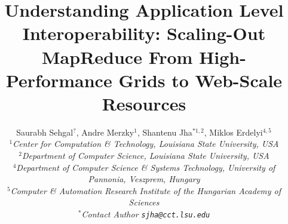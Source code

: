 \documentclass[3p,twocolumn]{elsarticle}
\begin{document}
\title{Understanding Application Level Interoperability: Scaling-Out
       MapReduce From High-Performance Grids to Web-Scale Resources}

\author{Saurabh Sehgal$^?$, Andre Merzky$^{1}$, Shantenu Jha$^{*1,2}$, Miklos Erdelyi$^{4,5}$
\\
\small{\emph{$^{1}$Center for Computation \& Technology, Louisiana State University, USA}}\\
\small{\emph{$^{2}$Department of Computer Science, Louisiana State University, USA}}\\
\small{\emph{$^{4}$Department of Computer Science \& Systems Technology, University of
                   Pannonia, Veszprem, Hungary}}\\
\small{\emph{$^{5}$Computer \& Automation Research Institute of the Hungarian Academy of
                   Sciences}}\\
\small{\emph{$^{*}$Contact Author \texttt{sjha@cct.lsu.edu}}}
}

\newif\ifdraft
\drafttrue
\ifdraft
 \newcommand{\amnote}[1]{     {\textcolor{magenta} { ***AM: #1 }}}
 \newcommand{\jhanote}[1]{    {\textcolor{red}     { ***SJ: #1 }}}
 \newcommand{\miklosnote}[1]{ {\textcolor{blue}    { ***ME: #1 }}}
 \newcommand{\ssnote}[1]{     {\textcolor{blue}    { ***SS: #1 }}}
\else
 \newcommand{\amnote}[1]{}
 \newcommand{\jhanote}[1]{}
 \newcommand{\miklosnote}[1]{}
 \newcommand{\ssnote}[1]{}
\fi

\newcommand{\sagamapreduce}{SAGA-MapReduce\xspace}
\newcommand{\smr}{\sagamapreduce}
\newcommand{\mr}{MapReduce\xspace}
\newcommand{\tc}{$T_c$\xspace}
\newcommand{\wc}{wordcount\xspace}
\newcommand{\Wc}{Wordcount\xspace}

\newcommand{\uppp}{\vspace*{-1em}}
\newcommand{\upp}{\vspace*{-0.66em}}
\newcommand{\up}{\vspace*{-0.33em}}
\newcommand{\shift}{\hspace*{1.00em}}

\newcommand{\T}[1]{\texttt{#1}}
\newcommand{\I}[1]{\textit{#1}}
\newcommand{\B}[1]{\textbf{#1}}
\newcommand{\F}[1]{\B{[FIXME: #1]}}
\newcommand{\TODO}[1]{\textcolor{red}{\B{TODO: #1}}}

\newcommand{\ssh}[1]{\T{ssh}\xspace}
\newcommand{\scp}[1]{\T{scp}\xspace}
\newcommand{\sshfs}[1]{\T{sshfs}\xspace}
 
\end{document}
